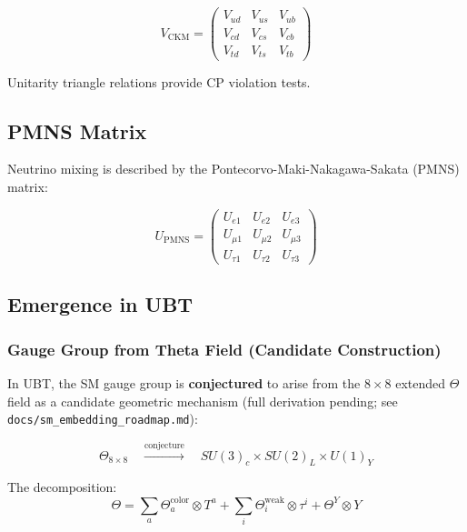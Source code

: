 \begin{equation}
V_{\text{CKM}} = \begin{pmatrix}
V_{ud} & V_{us} & V_{ub} \\
V_{cd} & V_{cs} & V_{cb} \\
V_{td} & V_{ts} & V_{tb}
\end{pmatrix}
\end{equation}

Unitarity triangle relations provide CP violation tests.

\subsection{PMNS Matrix}

Neutrino mixing is described by the Pontecorvo-Maki-Nakagawa-Sakata (PMNS) matrix:

\begin{equation}
U_{\text{PMNS}} = \begin{pmatrix}
U_{e1} & U_{e2} & U_{e3} \\
U_{\mu 1} & U_{\mu 2} & U_{\mu 3} \\
U_{\tau 1} & U_{\tau 2} & U_{\tau 3}
\end{pmatrix}
\end{equation}

\subsection{Emergence in UBT}

\subsubsection{Gauge Group from Theta Field (Candidate Construction)}

In UBT, the SM gauge group is \textbf{conjectured} to arise from the $8 \times 8$ extended $\Theta$ field as a candidate geometric mechanism (full derivation pending; see \texttt{docs/sm\_embedding\_roadmap.md}):

\begin{equation}
\Theta_{8 \times 8} \quad \xrightarrow{\text{conjecture}} \quad SU(3)_c \times SU(2)_L \times U(1)_Y
\end{equation}

The decomposition:
\begin{equation}
\Theta = \sum_a \Theta_a^{\text{color}} \otimes T^a + \sum_i \Theta_i^{\text{weak}} \otimes \tau^i + \Theta^Y \otimes Y
\end{equation}

